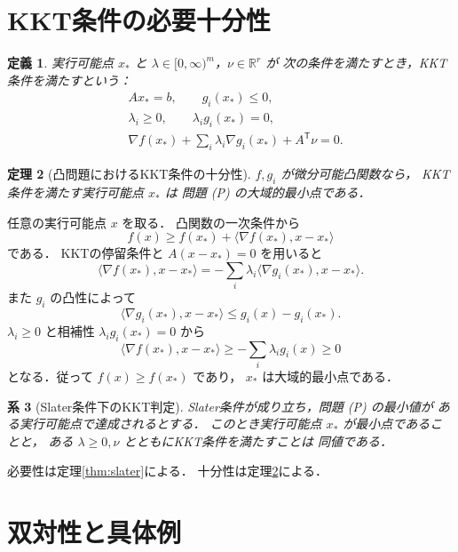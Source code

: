 \documentclass[a5paper,10pt,onecolumn]{jsarticle}
\makeatletter
\theoremstyle{mathnotetheorem}
\newtheorem{theorem}{定理}[section]
\newtheorem{definition}[theorem]{定義}
\newtheorem{corollary}[theorem]{系}
\renewcommand{\proofname}{証明}
\renewenvironment{proof}[1][\proofname]{%
  \par\pushQED{\qed}\normalfont\topsep4\p@\@plus2\p@\relax
  \trivlist\item[\hskip\labelsep\bfseries #1]\ignorespaces
}{\popQED\endtrivlist\@endpefalse}
\makeatother
\begin{document}
\section{KKT条件の必要十分性}

\begin{definition}
実行可能点 $x_*$ と
$\lambda\in[0,\infty)^m$，$\nu\in\mathbb R^r$ が
次の条件を満たすとき，\emph{KKT条件}を満たすという：
\[
 \begin{aligned}
 &Ax_*=b,\qquad g_i(x_*)\le0,\\
 &\lambda_i\ge0,\qquad \lambda_i g_i(x_*)=0,\\
 &\nabla f(x_*)+\sum_i\lambda_i\nabla g_i(x_*)
   +A^{\mathsf T}\nu=0.
 \end{aligned}
\]
\end{definition}

\begin{theorem}[凸問題におけるKKT条件の十分性]
\label{thm:kkt-sufficient}
$f,g_i$ が微分可能凸関数なら，
KKT条件を満たす実行可能点 $x_*$ は
問題 (P) の大域的最小点である．
\end{theorem}
\begin{proof}
任意の実行可能点 $x$ を取る．
凸関数の一次条件から
\[
 f(x)\ge f(x_*)+
 \langle\nabla f(x_*),x-x_*\rangle
\]
である．
KKTの停留条件と $A(x-x_*)=0$ を用いると
\[
 \langle\nabla f(x_*),x-x_*\rangle
 =-\sum_i\lambda_i
 \langle\nabla g_i(x_*),x-x_*\rangle.
\]
また $g_i$ の凸性によって
\[
 \langle\nabla g_i(x_*),x-x_*\rangle
 \le g_i(x)-g_i(x_*).
\]
$\lambda_i\ge0$ と相補性
$\lambda_i g_i(x_*)=0$ から
\[
 \langle\nabla f(x_*),x-x_*\rangle
 \ge-\sum_i\lambda_i g_i(x)\ge0
\]
となる．従って $f(x)\ge f(x_*)$ であり，
$x_*$ は大域的最小点である．
\end{proof}

\begin{corollary}[Slater条件下のKKT判定]
\label{cor:kkt-iff}
Slater条件が成り立ち，問題 (P) の最小値が
ある実行可能点で達成されるとする．
このとき実行可能点 $x_*$ が最小点であることと，
ある $\lambda\ge0,\nu$ とともにKKT条件を満たすことは
同値である．
\end{corollary}
\begin{proof}
必要性は定理\ref{thm:slater}による．
十分性は定理\ref{thm:kkt-sufficient}による．
\end{proof}

\section{双対性と具体例}
\end{document}
